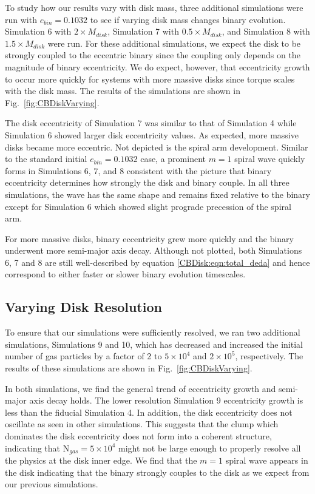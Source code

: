 To study how our results vary with disk mass, three additional simulations were run with $e_{bin} =
0.1032$ to see if varying disk mass changes binary evolution.  Simulation 6
with $2 \times M_{disk}$, Simulation 7 with $0.5 \times M_{disk}$, and
Simulation 8 with $1.5 \times M_{disk}$ were run.  For these additional simulations, we expect the disk to be strongly coupled to the eccentric binary since the 
coupling only depends on the magnitude of binary eccentricity.  We do expect, however, that eccentricity growth to occur more quickly for systems with more 
massive disks since torque scales with the disk mass.  The results of the simulations are shown in Fig.~\ref{fig:CBDiskVarying}.

The disk eccentricity of Simulation 7 was similar to that of Simulation 4 while Simulation 6 showed larger disk eccentricity values.  As expected, more massive 
disks became more eccentric.  Not depicted is the spiral arm development.  Similar to the standard initial $e_{bin} = 0.1032$ case, a prominent $m = 1$ spiral 
wave quickly forms in Simulations 6, 7, and 8 consistent with the picture that binary eccentricity determines how strongly the disk and binary couple.  In all three 
simulations, the wave has the same shape and remains fixed relative to the binary except for Simulation 6 which showed slight prograde precession of the 
spiral arm.  

For more massive disks, binary eccentricity grew more quickly and the binary underwent more semi-major axis decay.  Although not plotted, both Simulations 6, 7 and 8 are still well-described by equation \ref{CBDisk:eqn:total_deda} and hence correspond to
either faster or slower binary evolution timescales.  


\subsection{Varying Disk Resolution} \label{CBDisk:sec:VaryingDiscResolution}

To ensure that our simulations were sufficiently resolved, we ran two additional simulations, Simulations 9 and 10, which has decreased and increased
 the initial number of gas particles by a factor of 2 to $5 \times 10^4$ and $2 \times 10^5$, respectively.  The results of these simulations are shown in Fig.~\ref{fig:CBDiskVarying}.
 
 In both simulations, we find the general trend of eccentricity growth and semi-major axis decay holds.  The lower resolution Simulation 9 eccentricity 
 growth is less than the fiducial Simulation 4.  In addition, the disk eccentricity does not oscillate as seen in other simulations.  This suggests that the clump 
 which dominates the disk eccentricity does not form into a coherent structure, indicating that N$_{gas} = 5 \times 
 10^4$ might not be large enough to properly resolve all the physics at the disk inner edge.  We find that the $m = 1$ spiral wave appears in the disk indicating 
 that the binary strongly couples to the disk as we expect from our previous simulations.
 
